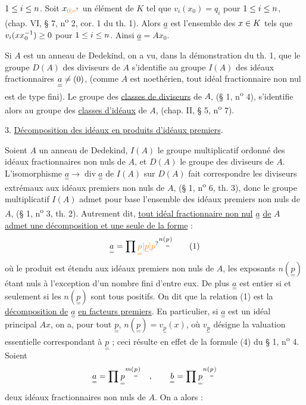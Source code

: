 $1\leq i\leq n$. Soit $x_{\unsure{0|o}}$ un élément de\unsure{,} $K$ tel que $v_i(x_0)=q_i$ pour $1\leq i\leq n$, (chap. VI, § 7, n\textsuperscript{o} 2, cor. 1 du th. 1). Alors $\underset{=}{a}$ est l'ensemble des $x\in K$ tels que $v_i(xx_0^{-1})\geq0$ pour $1\leq i\leq n$. Ainsi $\underset{=}{a}=Ax_0$.

Si $A$ est un anneau de Dedekind, on a vu, dans la démonstration du th. 1, que le groupe $D(A)$ des diviseurs de $A$ s'identifie au groupe $I(A)$ des idéaux fractionnaires $\underset{=}{a}\ne(0)$, (comme $A$ est noethérien, tout idéal fractionnaire non nul est de type fini). Le groupe des \uline{classes de diviseurs} de $A$, (§ 1, n\textsuperscript{o} 4), s'identifie alors au groupe des \uline{classes d'idéaux} de $A$, (chap. II, § 5, n\textsuperscript{o} 7).

3. \uline{Décomposition des idéaux en produits d'idéaux premiers}.

Soient $A$ un anneau de Dedekind, $I(A)$ le groupe multiplicatif ordonné des idéaux fractionnaires non nuls de $A$, et $D(A)$ le groupe des diviseurs de $A$. L'isomorphisme $\underset{=}{a}\longrightarrow\operatorname{div}\underset{=}{a}$ de $I(A)$ sur $D(A)$ fait correspondre les diviseurs extrémaux aux idéaux premiers non nuls de $A$, (§ 1, n\textsuperscript{o} 6, th. 3), donc le groupe multiplicatif $I(A)$ admet pour base l'ensemble des idéaux premiers non nuls de $A$, (§ 1, n\textsuperscript{o} 3, th. 2). Autrement dit, \uline{tout idéal fractionnaire non nul} $\underset{=}{a}$ \uline{de} $A$ \uline{admet une décomposition et une seule de la forme} :
\[
\underset{=}{a}=\handwritten{\prod}\unsure{\underset{=}{p}|\underline{p}|p}^{n(\underset{=}{p})}\tag*{(1)}
\]
où le produit est étendu aux idéaux premiers non nuls de $A$, les exposants $n(\underset{=}{p})$ étant nuls à l'exception d'un nombre fini d'entre eux. De plus $\underset{=}{a}$ est entier si et seulement si les $n(\underset{=}{p})$ sont tous positifs. On dit que la relation (1) est la \uline{décomposition de} $\underset{=}{a}$ \uline{en facteurs premiers}. En particulier, si $\underset{=}{a}$ est un idéal principal $Ax$, on a, pour tout $\underset{=}{p}$, $n(\underset{=}{p})=v_{\underset{=}{p}}(x)$, où $v_{\underset{=}{p}}$ désigne la valuation essentielle correspondant à $\underset{=}{p}$ ; ceci résulte en effet de la formule (4) du § 1, n\textsuperscript{o} 4. Soient
\[
\underset{=}{a}=\prod\underset{=}{p}^{m(\underset{=}{p})}\quad,\qquad \underset{=}{b}=\prod\underset{=}{p}^{n(\underset{=}{p})}
\]
deux idéaux fractionnaires non nuls de $A$. On a alors :

